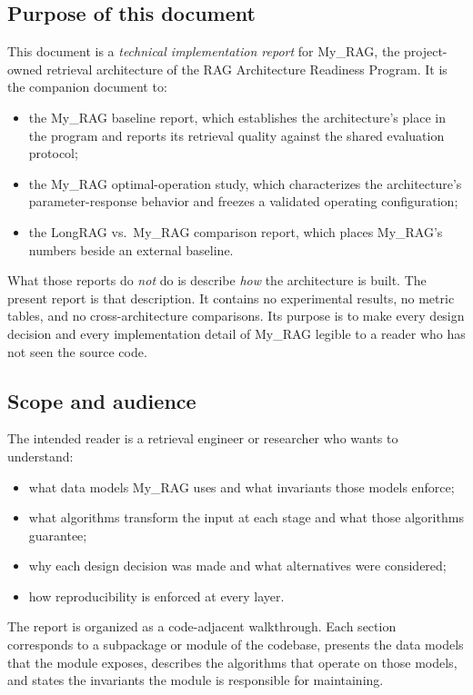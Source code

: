 \documentclass[11pt,a4paper]{article}
\begin{document}
\subsection{Purpose of this document}
This document is a \emph{technical implementation report} for My\_RAG,
the project-owned retrieval architecture of the RAG Architecture
Readiness Program. It is the companion document to:

\begin{itemize}[leftmargin=1.5em,itemsep=0.15em]
  \item the My\_RAG baseline report, which establishes the
    architecture's place in the program and reports its retrieval
    quality against the shared evaluation protocol;
  \item the My\_RAG optimal-operation study, which characterizes
    the architecture's parameter-response behavior and freezes a
    validated operating configuration;
  \item the LongRAG vs.\ My\_RAG comparison report, which places
    My\_RAG's numbers beside an external baseline.
\end{itemize}

What those reports do \emph{not} do is describe \emph{how} the
architecture is built. The present report is that description. It
contains no experimental results, no metric tables, and no
cross-architecture comparisons. Its purpose is to make every design
decision and every implementation detail of My\_RAG legible to a
reader who has not seen the source code.

\subsection{Scope and audience}
The intended reader is a retrieval engineer or researcher who wants
to understand:

\begin{itemize}[leftmargin=1.5em,itemsep=0.15em]
  \item what data models My\_RAG uses and what invariants those
    models enforce;
  \item what algorithms transform the input at each stage and what
    those algorithms guarantee;
  \item why each design decision was made and what alternatives
    were considered;
  \item how reproducibility is enforced at every layer.
\end{itemize}

The report is organized as a code-adjacent walkthrough. Each section
corresponds to a subpackage or module of the codebase, presents the
data models that the module exposes, describes the algorithms that
operate on those models, and states the invariants the module is
responsible for maintaining.
\end{document}
